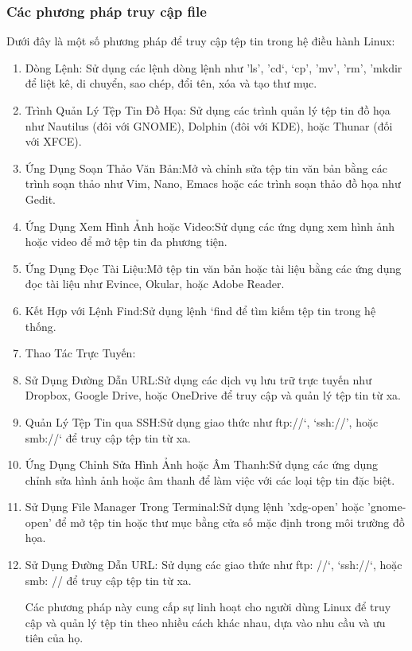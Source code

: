 \documentclass[12pt,a4paper]{article}
\begin{document}
\subsubsection{Các phương pháp truy cập file}
Dưới đây là một số phương pháp để truy cập tệp tin trong hệ điều hành Linux:
\begin{enumerate}
	\item Dòng Lệnh: Sử dụng các lệnh dòng lệnh như 'ls', 'cd`, `cp', 'mv', 'rm', 'mkdir để liệt kê, di chuyển, sao chép, đổi tên, xóa và tạo thư mục.
	\item Trình Quản Lý Tệp Tin Đồ Họa: Sử dụng các trình quản lý tệp tin đồ họa như Nautilus (đôi với GNOME), Dolphin (đôi với KDE), hoặc Thunar (đối với XFCE).
	\item Ứng Dụng Soạn Thảo Văn Bản:Mở và chỉnh sửa tệp tin văn bản bằng các trình soạn thảo như Vim, Nano, Emacs hoặc các trình soạn thảo đồ họa như Gedit.
	\item Ứng Dụng Xem Hình Ảnh hoặc Video:Sử dụng các ứng dụng xem hình ảnh hoặc video để mở tệp tin đa phương tiện.
	\item Ứng Dụng Đọc Tài Liệu:Mở tệp tin văn bản hoặc tài liệu bằng các ứng dụng đọc tài liệu như Evince, Okular, hoặc Adobe Reader.
	\item Kết Hợp với Lệnh Find:Sử dụng lệnh `find để tìm kiếm tệp tin trong hệ thống.
	\item Thao Tác Trực Tuyến:
	\item Sử Dụng Đường Dẫn URL:Sử dụng các dịch vụ lưu trữ trực tuyến như Dropbox, Google Drive, hoặc OneDrive để truy cập và quản lý tệp tin từ xa.
	\item Quản Lý Tệp Tin qua SSH:Sử dụng giao thức như ftp://`, `ssh://', hoặc smb://` để truy cập tệp tin từ xa.
	\item Ứng Dụng Chỉnh Sửa Hình Ảnh hoặc Âm Thanh:Sử dụng các ứng dụng chỉnh sửa hình ảnh hoặc âm thanh để làm việc với các loại tệp tin đặc biệt.
	\item Sử Dụng File Manager Trong Terminal:Sử dụng lệnh 'xdg-open' hoặc 'gnome-open' để mở tệp tin hoặc thư mục bằng cửa số mặc định trong môi trường đồ họa.
	\item Sử Dụng Đường Dẫn URL: Sử dụng các giao thức như ftp: //`, `ssh://`, hoặc smb: // để truy cập tệp tin từ xa.
	
	Các phương pháp này cung cấp sự linh hoạt cho người dùng Linux để truy cập và quản lý tệp tin theo nhiều cách khác nhau, dựa vào nhu cầu và ưu tiên của họ.
	
\end{enumerate}
\end{document}
